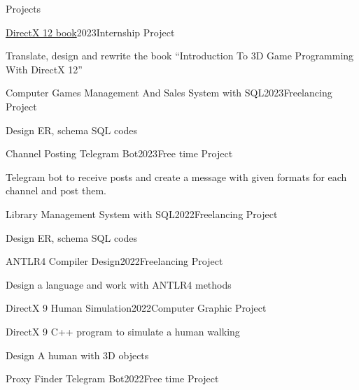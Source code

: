 \documentclass{resume} %
\begin{document}
    \begin{rSection}{Projects}
        \begin{rSubsection}{\href{https://github.com/bestmahdi2/IntroductionTo3DGameProgrammingWithDirectX12}{DirectX 12 book}}{2023}{Internship Project}{ }
            \item Translate, design and rewrite the book ``Introduction To 3D Game Programming With DirectX 12''
        \end{rSubsection}
        \begin{rSubsection}{Computer Games Management And Sales System with SQL}{2023}{Freelancing Project}{ }
            \item Design ER, schema SQL codes
        \end{rSubsection}
        \begin{rSubsection}{Channel Posting Telegram Bot}{2023}{Free time Project}{ }
            \item Telegram bot to receive posts and create a message with given formats for each channel and post them.
        \end{rSubsection}
        \begin{rSubsection}{Library Management System with SQL}{2022}{Freelancing Project}{ }
            \item Design ER, schema SQL codes
        \end{rSubsection}
        \begin{rSubsection}{ANTLR4 Compiler Design}{2022}{Freelancing Project}{ }
            \item Design a language and work with ANTLR4 methods
        \end{rSubsection}
        \begin{rSubsection}{DirectX 9 Human Simulation}{2022}{Computer Graphic Project}{ }
            \item DirectX 9 C++ program to simulate a human walking
            \item Design A human with 3D objects
        \end{rSubsection}
        \begin{rSubsection}{Proxy Finder Telegram Bot}{2022}{Free time Project}{ }

\end{rSubsection}
\end{rSection}
\end{document}

